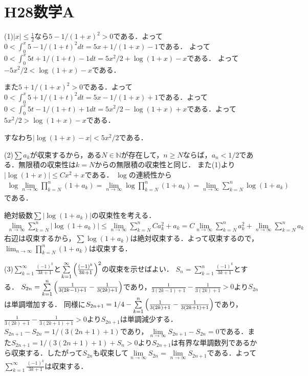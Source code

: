 \documentclass[
		book,
		head_space=20mm,
		foot_space=20mm,
		gutter=10mm,
		line_length=190mm
]{jlreq}
\begin{document}
\section{H28数学A}
(1)$|x|\le\frac{1}{2}$なら$5-1/(1+x)^2>0$である．よって
$0<\int_0^x 5-1/(1+t)^2dt=5x+1/(1+x)-1$である．
よって$0<\int_0^x 5t+1/(1+t)-1dt=5x^2/2+\log(1+x)-x$である．
よって$-5x^2/2<\log(1+x)-x$である．

また$5+1/(1+x)^2>0$である．よって$0<\int_0^x 5+1/(1+t)^2dt=5x-1/(1+x)+1$である．よって$0<\int_0^x 5t-1/(1+t)+1dt=5x^2/2-\log(1+x)+x$である．よって$5x^2/2>\log(1+x)-x$である．

すなわち$|\log (1+x)-x|<5x^2/2$である．

(2)$\sum a_k$が収束するから，ある$N \in  \mathbb{N}$が存在して，$n\ge N$ならば，$a_n < 1/2$である．無限積の収束性は$k=N$からの無限積の収束性と同じ．
また(1)より$|\log(1+x)|\le Cx^2+x$である．
$\log$の連続性から
\begin{align}
    \log \lim_{n\to\infty}\prod_{k=N}^n(1+a_k)=\lim_{n\to\infty}\log \prod_{k=N}^n(1+a_k)=\lim_{n\to\infty}\sum_{k=N}^n\log(1+a_k)
\end{align}である．

絶対級数$\sum |\log(1+a_k)|$の収束性を考える．
\begin{align}
    \lim_{n\to\infty}\sum_{k=N}^n|\log(1+a_k)|\le \lim_{n\to\infty}\sum_{k=N}^n C a_k^2+a_k=C\lim_{n\to\infty}\sum_{k=N}^n a_k^2+\lim_{n\to\infty}\sum_{k=N}^n a_k
\end{align}
右辺は収束するから，$\sum \log(1+a_k)$は絶対収束する．よって収束するので，$\lim_{n\to\infty}\prod_{k=N}^n(1+a_k)$は収束する．

(3)$\sum\limits_{k=1}^\infty\frac{(-1)^k}{3k+1}$と$\sum\limits_{k=1}^\infty\qty(\frac{(-1)^k}{3k+1})^2$の収束を示せばよい．
$S_n=\sum\limits_{k=1}^n\frac{(-1)^k}{3k+1}$とする．
$S_{2n}=\sum\limits_{k=1}^{n} \qty(\frac{1}{3(2k-1)+1}-\frac{1}{3(2k)+1})$であり，$\frac{1}{3(2k-1)+1}-\frac{1}{3(2k)+1}>0$より$S_{2n}$は単調増加する．
同様に$S_{2n+1}=1/4-\sum\limits_{k=1}^{n} \qty(\frac{1}{3(2k)+1}-\frac{1}{3(2k+1)+1})$であり，$\frac{1}{3(2k)+1}-\frac{1}{3(2k+1)+1}>0$より$S_{2n+1}$は単調減少する．
$S_{2n+1}-S_{2n}=1/(3(2n+1)+1)$であり，$\lim\limits_{n\to\infty}S_{2n+1}-S_{2n}=0$である．また$S_{2n+1}=1/(3(2n+1)+1)+S_n>0$より$S_{2n+1}$は有界な単調数列であるから収束する．したがって$S_{2n}$も収束して$\lim\limits_{n\to\infty}S_{2n}=\lim\limits_{n\to\infty}S_{2n+1}$である．よって$\sum\limits_{k=1}^\infty\frac{(-1)^k}{3k+1}$は収束する．
\end{document}
